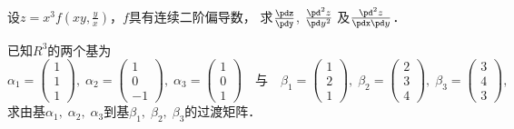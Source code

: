 \documentclass[plain,noanswer,medmath]{../../template/jnuexam}
\begin{document}






































\begin{problem}
设$z = x^3 f\left(xy,\frac{y}{x} \right)$，$f$具有连续二阶偏导数，
求$\frac{\pdz}{\pdy}$, $\frac{\pd^2 z}{\pd y^2}$
及$\frac{\pd^2 z}{\pdx\pd y}$．
\end{problem}




\begin{problem}
已知$R^3$的两个基为
$$\alpha_1 = \begin{pmatrix} 1 \\ 1 \\ 1 \end{pmatrix},\;
  \alpha_2 = \begin{pmatrix} 1 \\ 0 \\ -1 \end{pmatrix},\;
  \alpha_3 = \begin{pmatrix} 1 \\ 0 \\ 1 \end{pmatrix}
\quad \text{与}\quad
  \beta_1 = \begin{pmatrix} 1 \\ 2 \\ 1 \end{pmatrix},\;
  \beta_2 = \begin{pmatrix} 2 \\ 3 \\ 4 \end{pmatrix},\;
  \beta_3 = \begin{pmatrix} 3 \\ 4 \\ 3 \end{pmatrix},$$
求由基$\alpha_1,\;\alpha_2,\;\alpha_3$到基$\beta_1,\;\beta_2,\;\beta_3$的过渡矩阵．
\end{problem}
\end{document}
